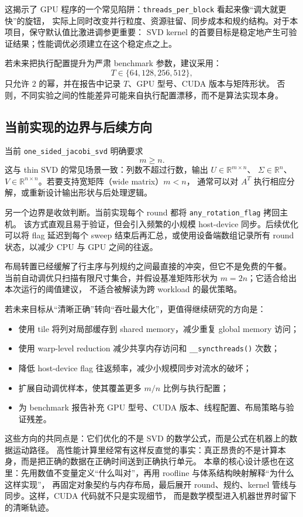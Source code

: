 这揭示了 GPU 程序的一个常见陷阱：\texttt{threads\_per\_block} 看起来像“调大就更快”的旋钮，
实际上同时改变并行粒度、资源驻留、同步成本和规约结构。对于本项目，保守默认值比激进调参更重要：
SVD kernel 的首要目标是稳定地产生可验证结果；性能调优必须建立在这个稳定点之上。

若未来把执行配置提升为严肃 benchmark 参数，建议采用：
\[
    T\in\{64,128,256,512\},
\]
只允许 \(2\) 的幂，并在报告中记录 \(T\)、GPU 型号、CUDA 版本与矩阵形状。
否则，不同实验之间的性能差异可能来自执行配置漂移，而不是算法实现本身。

\subsection{当前实现的边界与后续方向}

当前 \texttt{one\_sided\_jacobi\_svd} 明确要求
\[
    m\ge n.
\]
这与 thin SVD 的常见场景一致：列数不超过行数，输出 \(U\in\mathbb{R}^{m\times n}\)、
\(\Sigma\in\mathbb{R}^{n}\)、\(V\in\mathbb{R}^{n\times n}\)。若要支持宽矩阵（wide matrix）\(m<n\)，
通常可以对 \(A^T\) 执行相应分解，或重新设计输出形状与后处理逻辑。

另一个边界是收敛判断。当前实现每个 round 都将 \texttt{any\_rotation\_flag} 拷回主机。
该方式直观且易于验证，但会引入频繁的小规模 host-device 同步。后续优化可以将 flag 延迟到每个 sweep
结束后再汇总，或使用设备端数组记录所有 round 状态，以减少 CPU 与 GPU 之间的往返。

布局转置已经缓解了行主序与列规约之间最直接的冲突，但它不是免费的午餐。
当前自动调优只扫描有限尺寸集合，并假设基准矩阵形状为 \(m=2n\)；它适合给出本次运行的阈值建议，
不适合被解读为跨 workload 的最优策略。

若未来目标从“清晰正确”转向“吞吐最大化”，更值得继续研究的方向是：

\begin{itemize}
    \item 使用 tile 将列对局部缓存到 shared memory，减少重复 global memory 访问；
    \item 使用 warp-level reduction 减少共享内存访问和 \texttt{\_\_syncthreads()} 次数；
    \item 降低 host-device flag 往返频率，减少小规模同步对流水的破坏；
    \item 扩展自动调优样本，使其覆盖更多 \(m/n\) 比例与执行配置；
    \item 为 benchmark 报告补充 GPU 型号、CUDA 版本、线程配置、布局策略与验证残差。
\end{itemize}

这些方向的共同点是：它们优化的不是 SVD 的数学公式，而是公式在机器上的数据运动路径。
高性能计算里经常有这样反直觉的事实：真正昂贵的不是计算本身，而是把正确的数据在正确时间送到正确执行单元。
本章的核心设计感也在这里：先用数值不变量定义“什么叫对”，再用 roofline 与体系结构映射解释“为什么这样实现”，
再固定对象契约与内存布局，最后展开 round、规约、kernel 管线与同步。这样，CUDA 代码就不只是实现细节，
而是数学模型进入机器世界时留下的清晰轨迹。
